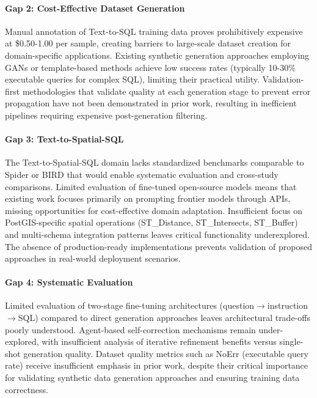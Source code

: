 \paragraph{Gap 2: Cost-Effective Dataset Generation}

Manual annotation of Text-to-SQL training data proves prohibitively expensive at \$0.50-1.00 per sample, creating barriers to large-scale dataset creation for domain-specific applications. Existing synthetic generation approaches employing GANs or template-based methods achieve low success rates (typically 10-30\% executable queries for complex SQL), limiting their practical utility. Validation-first methodologies that validate quality at each generation stage to prevent error propagation have not been demonstrated in prior work, resulting in inefficient pipelines requiring expensive post-generation filtering.

\paragraph{Gap 3: Text-to-Spatial-SQL}

The Text-to-Spatial-SQL domain lacks standardized benchmarks comparable to Spider or BIRD that would enable systematic evaluation and cross-study comparisons. Limited evaluation of fine-tuned open-source models means that existing work focuses primarily on prompting frontier models through APIs, missing opportunities for cost-effective domain adaptation. Insufficient focus on PostGIS-specific spatial operations (ST\_Distance, ST\_Intersects, ST\_Buffer) and multi-schema integration patterns leaves critical functionality underexplored. The absence of production-ready implementations prevents validation of proposed approaches in real-world deployment scenarios.

\paragraph{Gap 4: Systematic Evaluation}

Limited evaluation of two-stage fine-tuning architectures (question$\rightarrow$instruction$\rightarrow$SQL) compared to direct generation approaches leaves architectural trade-offs poorly understood. Agent-based self-correction mechanisms remain under-explored, with insufficient analysis of iterative refinement benefits versus single-shot generation quality. Dataset quality metrics such as NoErr (executable query rate) receive insufficient emphasis in prior work, despite their critical importance for validating synthetic data generation approaches and ensuring training data correctness.

